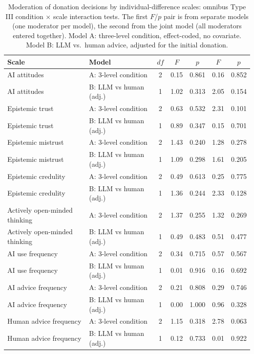 \begin{table}

\caption{\label{tab:scale_moderation}Moderation of donation decisions by individual-difference scales: omnibus Type III condition $\times$ scale interaction tests. The first $F$/$p$ pair is from separate models (one moderator per model), the second from the joint model (all moderators entered together). Model A: three-level condition, effect-coded, no covariate. Model B: LLM vs.\ human advice, adjusted for the initial donation.}
\centering
\begin{tabular}[t]{llccccc}
\toprule
Scale & Model & $df$ & $F$ & $p$ & $F$ & $p$\\
\midrule
AI attitudes & A: 3-level condition & 2 & 0.15 & 0.861 & 0.16 & 0.852\\
AI attitudes & B: LLM vs human (adj.) & 1 & 1.02 & 0.313 & 2.05 & 0.154\\
Epistemic trust & A: 3-level condition & 2 & 0.63 & 0.532 & 2.31 & 0.101\\
Epistemic trust & B: LLM vs human (adj.) & 1 & 0.89 & 0.347 & 0.15 & 0.701\\
Epistemic mistrust & A: 3-level condition & 2 & 1.43 & 0.240 & 1.28 & 0.278\\
\addlinespace
Epistemic mistrust & B: LLM vs human (adj.) & 1 & 1.09 & 0.298 & 1.61 & 0.205\\
Epistemic credulity & A: 3-level condition & 2 & 0.49 & 0.613 & 0.25 & 0.775\\
Epistemic credulity & B: LLM vs human (adj.) & 1 & 1.36 & 0.244 & 2.33 & 0.128\\
Actively open-minded thinking & A: 3-level condition & 2 & 1.37 & 0.255 & 1.32 & 0.269\\
Actively open-minded thinking & B: LLM vs human (adj.) & 1 & 0.49 & 0.483 & 0.51 & 0.477\\
\addlinespace
AI use frequency & A: 3-level condition & 2 & 0.34 & 0.715 & 0.57 & 0.567\\
AI use frequency & B: LLM vs human (adj.) & 1 & 0.01 & 0.916 & 0.16 & 0.692\\
AI advice frequency & A: 3-level condition & 2 & 0.21 & 0.808 & 0.29 & 0.746\\
AI advice frequency & B: LLM vs human (adj.) & 1 & 0.00 & 1.000 & 0.96 & 0.328\\
Human advice frequency & A: 3-level condition & 2 & 1.15 & 0.318 & 2.78 & 0.063\\
\addlinespace
Human advice frequency & B: LLM vs human (adj.) & 1 & 0.12 & 0.733 & 0.01 & 0.922\\
\bottomrule
\end{tabular}
\end{table}
